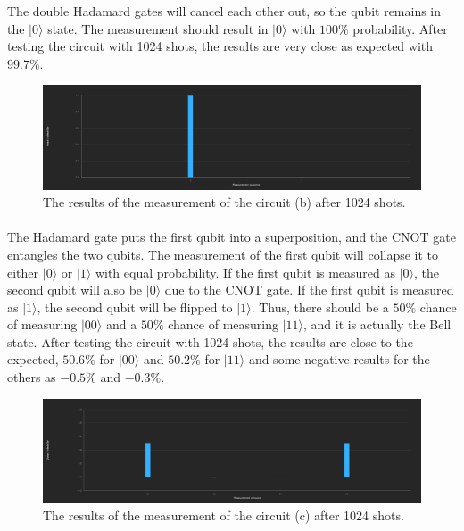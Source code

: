 \documentclass[12pt]{article}
\begin{document}
The double Hadamard gates will cancel each other out, so the qubit remains in the $|0⟩$ state. The measurement should result in $|0⟩$ with $100\%$ probability. After testing the circuit with 1024 shots, the results are very close as expected with $ 99.7\%$.

\begin{figure}[H]
    \centering
    \includegraphics[scale=0.27]{b.png}
    \caption{The results of the measurement of the circuit (b) after 1024 shots.}
\end{figure}

\newpage

\paragraph*{}

The Hadamard gate puts the first qubit into a superposition, and the CNOT gate entangles the two qubits. The measurement of the first qubit will collapse it to either $|0⟩$ or $|1⟩$ with equal probability. If the first qubit is measured as $|0⟩$, the second qubit will also be $|0⟩$ due to the CNOT gate. If the first qubit is measured as $|1⟩$, the second qubit will be flipped to $|1⟩$. Thus, there should be a $50\%$ chance of measuring $|00⟩$ and a $50\%$ chance of measuring $|11⟩$, and it is actually the Bell state. After testing the circuit with 1024 shots, the results are close to the expected, $50.6\%$ for $|00⟩$ and $50.2\%$ for $|11⟩$ and some negative results for the others as $-0.5\%$ and $-0.3\%$.

\begin{figure}[H]
    \centering
    \includegraphics[scale=0.27]{c.png}
    \caption{The results of the measurement of the circuit (c) after 1024 shots.}
\end{figure}
\end{document}
